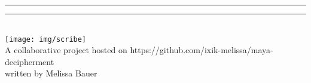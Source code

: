 \documentclass[../main.tex]{subfiles}
\begin{document}
\begin{titlepage}	
\begin{center}
	\noindent\rule[1ex]{\textwidth}{1pt}
	\Large{\textsf{\worktitle}}
	\noindent\rule[1ex]{\textwidth}{1pt}
	\vspace{2em}	
	\\
	\texttt{[image: img/scribe]}
	\\
	A collaborative project hosted on
	https://github.com/ixik-melissa/maya-decipherment\\
	written by Melissa Bauer
	\vspace{2em}
	\\
\end{center}
\begin{flushright}
	\documentversionlongcount \documentversiontzolkin \documentversionhaab
	\\
	\documentversiongregoriandate{}
\end{flushright}
\end{titlepage}	

\clearpage 
\thispagestyle{empty}
\section*{}

\end{document}
